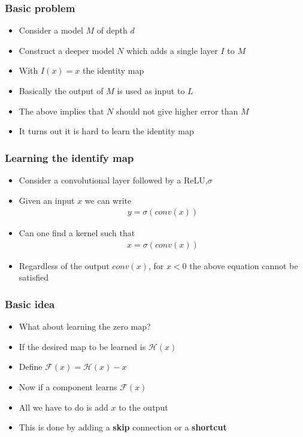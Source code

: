 \documentclass{beamer}
\begin{document}
\begin{frame}
    \frametitle{Basic problem}
\begin{itemize}
    \item Consider a model $M$ of depth $d$
    \item Construct a deeper model $N$ which adds a single layer $I$ to $M$
    \item With $I(x)=x$ the identity map
    \item Basically the output of $M$ is used as input to $L$
    \item The above implies that $N$ should not give higher error than $M$
    \item It turns out it is hard to learn the identity map
\end{itemize}
\end{frame}
\begin{frame}
    \frametitle{Learning the identify map}

\begin{itemize}
    \item Consider a convolutional layer followed by a ReLU,$\sigma$
    \item Given an input $x$ we can write
    \begin{align*}
        y=\sigma(conv(x))
    \end{align*}
    \item Can one find a kernel such that
    \begin{align*}
        x=\sigma(conv(x))
    \end{align*}
     \item  Regardless of the output $conv(x)$, for $x<0$ the above equation cannot be satisfied 
\end{itemize}    

\end{frame}
\begin{frame}
    \frametitle{Basic idea}
\begin{itemize}
    \item What about learning the zero map?
    \item If the desired map to be learned is $\mathcal{H}(x)$
    \item Define $\mathcal{F}(x)=\mathcal{H}(x)-x$
    \item Now if a component learns $\mathcal{F}(x)$
    \item All we have to do is add $x$ to the output
    \item This is done by adding a \textbf{skip} connection or a \textbf{shortcut}
\end{itemize}

\end{frame}
\end{document}
